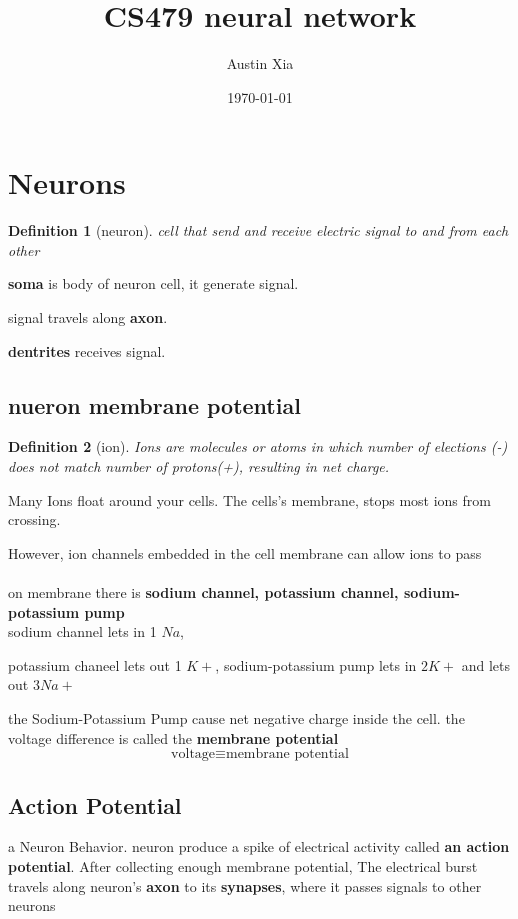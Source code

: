 \documentclass[10pt]{article}
\theoremstyle{break}
\newtheorem{defn}{Definition}[subsection]
\begin{document}
\let\ref\Cref

\title{\bf{CS479 neural network}}
\date{\today}
\author{Austin Xia}

\maketitle
\newpage
\tableofcontents
\listoffigures
\listoftables
\newpage
\section{Neurons}
\begin{defn}[neuron]
    cell that send and receive electric signal to and from each other 
\end{defn}  

\textbf{soma} is body of neuron cell, it generate signal.

signal travels along \textbf{axon}.

\textbf{dentrites} receives signal.

\subsection{nueron membrane potential}
\begin{defn}[ion]
    Ions are molecules or atoms in which number of elections (-) does not match
    number of protons(+), resulting in net charge.
\end{defn}
Many Ions float around your cells. The cells's membrane, stops most ions from crossing.

However, ion channels embedded in the cell membrane can allow ions to pass\\\\

on membrane there is \textbf{sodium channel, potassium channel, sodium-potassium pump}\\
sodium channel lets in 1 $Na$, 

potassium chaneel lets out 1 $K+$, sodium-potassium pump lets in $2K+$ and lets out $3Na+$

the Sodium-Potassium Pump cause net negative charge inside the cell. the voltage difference is called the \textbf{membrane potential}
$$\text{voltage} \equiv \text{membrane potential}$$

\subsection{Action Potential}
a Neuron Behavior. neuron produce a spike of electrical activity called 
\textbf{an action potential}.
After collecting enough membrane potential, The electrical burst travels along neuron's \textbf{axon} to its \textbf{synapses}, where it passes signals to other neurons
\end{document}

